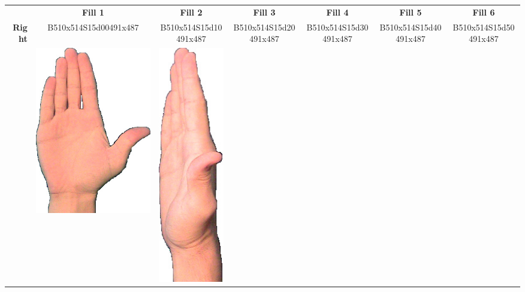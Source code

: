 \documentclass{article}
\begin{document}
\begin{center}
\begin{tabular}{r*{6}{c}}
&\textbf{Fill 1}&\textbf{Fill 2}&\textbf{Fill 3}&\textbf{Fill 4}&\textbf{Fill 5}&\textbf{Fill 6}\\
\multirow{2}{*}{\textbf{Right}}&
B510x514S15d00491x487&
B510x514S15d10491x487&
B510x514S15d20491x487&
B510x514S15d30491x487&
B510x514S15d40491x487&
B510x514S15d50491x487\\
&
\includegraphics[scale=0.1]{images/05-12-1.jpg}&
\includegraphics[scale=0.1]{images/05-12-2.jpg}&

\end{tabular}
\end{center}
\end{document}
